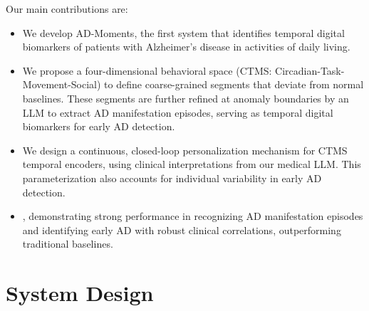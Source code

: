 \documentclass[sigconf, anonymous, 9pt, nonacm]{acmart}
\newcommand{\sys}{AD-Moments\xspace}
\begin{document}
Our main contributions are:
\begin{itemize}
\item We develop \sys, the first system that identifies temporal digital biomarkers of patients with Alzheimer's disease in activities of daily living.
\item We propose a four-dimensional behavioral space (CTMS: Circadian-Task-Movement-Social) to define coarse-grained segments that deviate from normal baselines. These segments are further refined at anomaly boundaries by an LLM to extract AD manifestation episodes, serving as temporal digital biomarkers for early AD detection.

\item We design a continuous, closed-loop personalization mechanism for CTMS temporal encoders, using clinical interpretations from our medical LLM.
This parameterization also accounts for individual variability in early AD detection.


\item {}, demonstrating strong performance in recognizing AD manifestation episodes and identifying early AD with robust clinical correlations, outperforming traditional baselines.
\end{itemize}



\section{System Design}
\label{sec:design}
\end{document}
